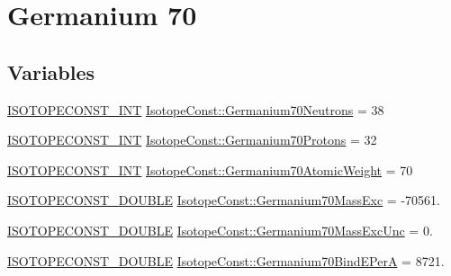 \hypertarget{group___isotope_const-_germanium-_ge70}{}\section{Germanium 70}
\label{group___isotope_const-_germanium-_ge70}
\subsection*{Variables}
\begin{DoxyCompactItemize}
\item 
\mbox{\hyperlink{group___isotope_const-_macros_ga5f18360b3e99483a35c32d789e62621c}{I\+S\+O\+T\+O\+P\+E\+C\+O\+N\+S\+T\+\_\+\+I\+NT}} \mbox{\hyperlink{group___isotope_const-_germanium-_ge70_ga07b3ed85f0ea9681667f562c4d9b2f62}{Isotope\+Const\+::\+Germanium70\+Neutrons}} = 38
\item 
\mbox{\hyperlink{group___isotope_const-_macros_ga5f18360b3e99483a35c32d789e62621c}{I\+S\+O\+T\+O\+P\+E\+C\+O\+N\+S\+T\+\_\+\+I\+NT}} \mbox{\hyperlink{group___isotope_const-_germanium-_ge70_ga5d2b1262223c1f5f79beb862eb79d023}{Isotope\+Const\+::\+Germanium70\+Protons}} = 32
\item 
\mbox{\hyperlink{group___isotope_const-_macros_ga5f18360b3e99483a35c32d789e62621c}{I\+S\+O\+T\+O\+P\+E\+C\+O\+N\+S\+T\+\_\+\+I\+NT}} \mbox{\hyperlink{group___isotope_const-_germanium-_ge70_gabf4722be4520231089e73746df0bc5bb}{Isotope\+Const\+::\+Germanium70\+Atomic\+Weight}} = 70
\item 
\mbox{\hyperlink{group___isotope_const-_macros_ga8f45a7272ce02c0b4c65c44636ed719a}{I\+S\+O\+T\+O\+P\+E\+C\+O\+N\+S\+T\+\_\+\+D\+O\+U\+B\+LE}} \mbox{\hyperlink{group___isotope_const-_germanium-_ge70_ga6e51485e255e1c0ce5fcf74a179c3501}{Isotope\+Const\+::\+Germanium70\+Mass\+Exc}} = -\/70561.
\item 
\mbox{\hyperlink{group___isotope_const-_macros_ga8f45a7272ce02c0b4c65c44636ed719a}{I\+S\+O\+T\+O\+P\+E\+C\+O\+N\+S\+T\+\_\+\+D\+O\+U\+B\+LE}} \mbox{\hyperlink{group___isotope_const-_germanium-_ge70_ga455e1a8358b0447a6dc5c0014d0ddda2}{Isotope\+Const\+::\+Germanium70\+Mass\+Exc\+Unc}} = 0.
\item 
\mbox{\hyperlink{group___isotope_const-_macros_ga8f45a7272ce02c0b4c65c44636ed719a}{I\+S\+O\+T\+O\+P\+E\+C\+O\+N\+S\+T\+\_\+\+D\+O\+U\+B\+LE}} \mbox{\hyperlink{group___isotope_const-_germanium-_ge70_ga749d63c65c39e4f142659d0bbec53086}{Isotope\+Const\+::\+Germanium70\+Bind\+E\+PerA}} = 8721.
\item 

\end{DoxyCompactItemize}
